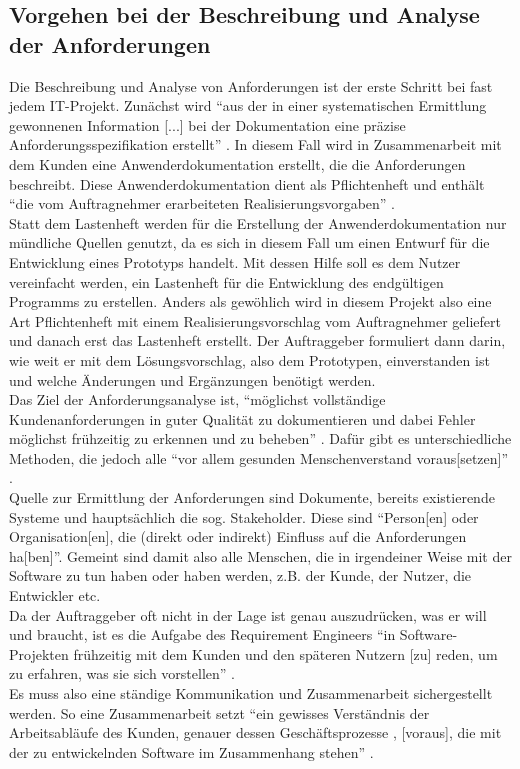 \documentclass [12pt, a4paper, oneside, titlepage, ngerman]{article}
\begin{document}
\subsection{Vorgehen bei der Beschreibung und Analyse der Anforderungen}
Die Beschreibung und Analyse von Anforderungen ist der erste Schritt bei fast jedem IT-Projekt. Zunächst wird "`aus der in einer systematischen Ermittlung gewonnenen Information [...] bei der Dokumentation eine präzise Anforderungsspezifikation erstellt"' \cite[S.44]{partsch2010}. In diesem Fall wird in Zusammenarbeit mit dem Kunden eine Anwenderdokumentation erstellt, die die Anforderungen beschreibt. Diese Anwenderdokumentation dient als Pflichtenheft und enthält "`die vom Auftragnehmer erarbeiteten Realisierungsvorgaben"' \cite[S.41]{PohlRupp2015}.\\
Statt dem Lastenheft werden für die Erstellung der Anwenderdokumentation nur mündliche Quellen genutzt, da es sich in diesem Fall um einen Entwurf für die Entwicklung eines Prototyps handelt. Mit dessen Hilfe soll es dem Nutzer vereinfacht werden, ein Lastenheft für die Entwicklung des endgültigen Programms zu erstellen. Anders als gewöhlich wird in diesem Projekt also eine Art Pflichtenheft mit einem Realisierungsvorschlag vom Auftragnehmer geliefert und danach erst das Lastenheft erstellt. Der Auftraggeber formuliert dann darin, wie weit er mit dem Lösungsvorschlag, also dem Prototypen, einverstanden ist und welche Änderungen und Ergänzungen benötigt werden. \\

\noindent Das Ziel der Anforderungsanalyse ist, "`möglichst vollständige Kundenanforderungen in guter Qualität zu dokumentieren und dabei Fehler möglichst frühzeitig zu erkennen und zu beheben"' \cite[S.11]{PohlRupp2015}. Dafür gibt es unterschiedliche Methoden, die jedoch alle "`vor allem gesunden Menschenverstand voraus[setzen]"' \cite[S.58]{partsch2010}.\\
Quelle zur Ermittlung der Anforderungen sind Dokumente, bereits existierende Systeme und hauptsächlich die sog. Stakeholder. Diese sind "`Person[en] oder Organisation[en], die (direkt oder indirekt) Einfluss auf die Anforderungen ha[ben]"'\cite[S.21]{PohlRupp2015}. Gemeint sind damit also alle Menschen, die in irgendeiner Weise mit der Software zu tun haben oder haben werden, z.B. der Kunde, der Nutzer, die Entwickler etc. \\
Da der Auftraggeber oft nicht in der Lage ist genau auszudrücken, was er will und braucht, ist es die Aufgabe des Requirement Engineers "`in Software-Projekten frühzeitig mit dem Kunden und den späteren Nutzern [zu] reden, um zu erfahren, was sie sich vorstellen"' \cite[S.15]{kleuker2006}.\\
Es muss also eine ständige Kommunikation und Zusammenarbeit sichergestellt werden. So eine Zusammenarbeit setzt "`ein gewisses Verständnis der Arbeitsabläufe des Kunden, genauer dessen Geschäftsprozesse \cite[vgl.][]{Gad03}, [voraus], die mit der zu entwickelnden Software im Zusammenhang stehen"' \cite[S.15]{kleuker2006}.
\end{document}
